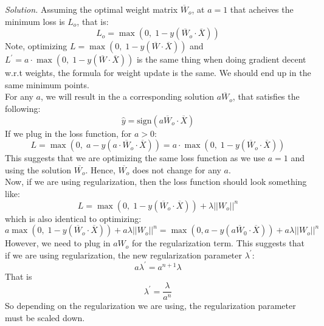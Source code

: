 \documentclass[12pt]{article}
\newcommand\sol[1] {
    \begin{mdframed}
        \emph{Solution.} #1
    \end{mdframed}
}
\begin{document}
\begin{enumerate}[ref=\theenumi]
        \sol {
            Assuming the optimal weight matrix $\overline{W}_o$, at $a = 1$ that
            acheives the minimum loss is $L_o$, that is:
            \[
                L_o = \max{(0,\;1 - y(\overline{W}_o \cdot \overline{X}))}
            \]
            Note, optimizing $L = \max{(0,\;1 - y(\overline{W} \cdot \overline{X}))}$
            and $L^{\prime} = a \cdot \max{(0,\;1 - y(\overline{W} \cdot \overline{X}))}$
            is the same thing when doing gradient decent w.r.t weights, the 
            formula for weight update is the same. We should end up in the same
            minimum points. \\
            For any $a$, we will result in the a corresponding solution 
            $a \overline{W}_o$, that satisfies the following:
            \[
                \hat{y} = \text{sign}( a \overline{W}_o \cdot \overline{X} )
            \]
            If we plug in the loss function, for $a > 0$:
            \[
                L = \max{(0,\;a - y(a \cdot \overline{W}_o \cdot \overline{X}))}
                = a \cdot \max{(0,\;1 - y(\overline{W}_o \cdot \overline{X}))}
            \]
            This suggests that we are optimizing the same loss function as we use
            $a = 1$ and using the solution $\overline{W_o}$. Hence, 
            $\overline{W_o}$ does not change for any $a$. \\
            Now, if we are using regularization, then the loss function
            should look something like:
            \[
                L = \max{(0,\;1 - y(\overline{W}_o \cdot \overline{X}))}
                + \lambda ||W_o||^n
            \]
            which is also identical to optimizing:
            \[
                a \max{(0,\;1 - y(\overline{W}_o \cdot \overline{X}))}
                + a \lambda ||W_o||^n = 
                \max{(0, a - y(a \overline{W}_0 \cdot
                \overline{X}))} + a \lambda ||W_o||^n
            \]
            However, we need to plug in $a W_o$ for the regularization term.
            This suggests that if we are using regularization, the new 
            regularization parameter $\lambda^{\prime}$:
            \[
                a \lambda^{\prime} = a^{n + 1} \lambda
            \]
            That is 
            \[
                \lambda^{\prime} = \frac{\lambda}{a^n}
            \]
            So depending on the regularization we are using, the regularization
            parameter must be scaled down.
        }
  

\end{enumerate}
\end{document}
